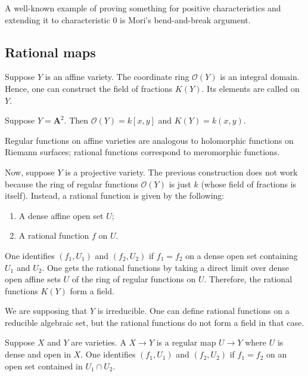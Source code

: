 \documentclass[11pt, oneside,margin=1in]{article}
\begin{document}
\begin{remark}
	A well-known example of proving something for positive characteristics and extending it to characteristic $0$ is Mori's bend-and-break argument.
\end{remark}

\subsection{Rational maps}

Suppose $Y$ is an affine variety. The coordinate ring $\mathscr{O}(Y)$ is an integral domain. Hence, one can construct the field of fractions $K(Y)$. Its elements are called  on $Y$.

\begin{example}[ ]\label{}\text{}
Suppose $Y=\mathbf{A}^2$. Then $\mathscr{O}(Y) = k[x,y]$ and $K(Y) =k(x,y)$. 
\end{example}

\begin{remark}
	Regular functions on affine varieties are analogous to holomorphic functions on Riemann surfaces; rational functions correspond to meromorphic functions.
\end{remark}

Now, suppose $Y$ is a projective variety. The previous construction does not work because the ring of regular functions $\mathscr{O}(Y)$ is just $k$ (whose field of fractions is itself). Instead, a rational function is given by the following:
 \begin{enumerate}
	\item A dense affine open set $U$;
	\item A rational function $f$ on $U$.
\end{enumerate}
One identifies $(f_1,U_1)$ and $(f_2,U_2)$ if $f_1=f_2$ on a dense open set containing $U_1$ and $U_2$. One gets the rational functions by taking a direct limit over dense open affine sets $U$ of the ring of regular functions on $U$. Therefore, the rational functions $K(Y)$ form a field.

\begin{remark}
	We are supposing that $Y$ is irreducible. One can define rational functions on a reducible algebraic set, but the rational functions do not form a field in that case.
\end{remark}

Suppose $X$ and $Y$ are varieties. A  $X\longrightarrow Y$ is a regular map $U\longrightarrow Y$ where $U$ is dense and open in $X$. One identifies $(f_1,U_1)$ and $(f_2,U_2)$ if $f_1=f_2$ on an open set contained in $U_1\cap U_2$.
\end{document}
